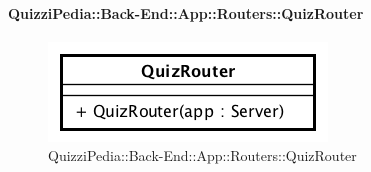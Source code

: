 \paragraph{QuizziPedia::Back-End::App::Routers::QuizRouter}
\label{QuizziPedia::Back-End::App::Routers::QuizRouter}
\begin{figure}[ht]
	\centering
	\includegraphics[scale=0.80]{UML/Classi/Back-End/QuizziPedia_Back-End_App_Routers_quizRouter.png}
	\caption{QuizziPedia::Back-End::App::Routers::QuizRouter}
\end{figure}
\FloatBarrier
